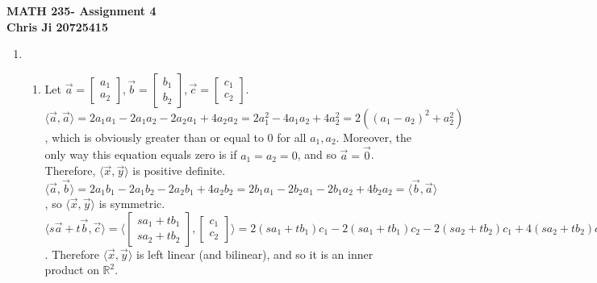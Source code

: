 \documentclass[10pt,english]{article}
\begin{document}
\noindent \begin{center}
\textbf{\large{}MATH 235- Assignment 4}\\
\textbf{\large{}Chris Ji 20725415}
\par\end{center}{\large \par}
\medskip{}

\begin{enumerate}
\item \begin{enumerate}
    \item  Let $\vec{a}=\begin{bmatrix}a_1\\a_2\end{bmatrix},\vec{b}=\begin{bmatrix}b_1\\b_2\end{bmatrix},\vec{c}=\begin{bmatrix}c_1\\c_2\end{bmatrix}$. \\
    $\langle\vec{a},\vec{a}\rangle=2a_1a_1-2a_1a_2-2a_2a_1+4a_2a_2=2a_1^2-4a_1a_2+4a_2^2=2((a_1-a_2)^2+a_2^2)$, which is obviously greater than or equal to $0$ for all $a_1,a_2$. Moreover, the only way this equation equals zero is if $a_1=a_2=0$, and so $\vec{a}=\vec{0}$. Therefore, $\langle\vec{x},\vec{y}\rangle$ is positive definite. \\ 
    $\langle\vec{a},\vec{b}\rangle=2a_1b_1-2a_1b_2-2a_2b_1+4a_2b_2=2b_1a_1-2b_2a_1-2b_1a_2+4b_2a_2=\langle\vec{b},\vec{a}\rangle$, so $\langle\vec{x},\vec{y}\rangle$ is symmetric. \\ 
    $\langle s\vec{a}+t\vec{b},\vec{c}\rangle=\langle\begin{bmatrix}sa_1+tb_1\\sa_2+tb_2\end{bmatrix},\begin{bmatrix}c_1\\c_2\end{bmatrix}\rangle=2(sa_1+tb_1)c_1-2(sa_1+tb_1)c_2-2(sa_2+tb_2)c_1+4(sa_2+tb_2)c_2=s(2a_1c_1-2a_1c_2-2a_2c_1+4a_2c_2)+t(2b_1c_1-2b_1c_2-2b_2c_1+4b_2c_2)=s\langle\vec{a},\vec{c}\rangle+t\langle\vec{b},\vec{c}\rangle$. Therefore $\langle\vec{x},\vec{y}\rangle$ is left linear (and bilinear), and so it is an inner product on $\mathbb{R}^2$. 
    

\end{enumerate}
\end{enumerate}
\end{document}
